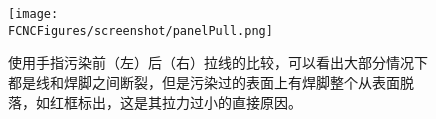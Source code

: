 \begin{figure}[H]
\centering
\texttt{[image: \\FCNCFigures/screenshot/panelPull.png]}
\caption{使用手指污染前（左）后（右）拉线的比较，可以看出大部分情况下都是线和焊脚之间断裂，但是污染过的表面上有焊脚整个从表面脱落，如红框标出，这是其拉力过小的直接原因。}
\label{fig:panelPull}
\end{figure}